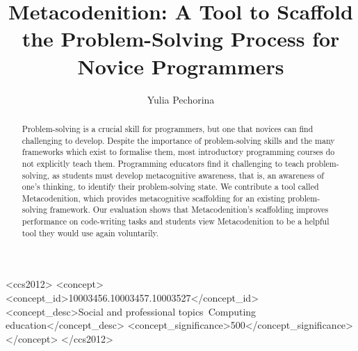 \documentclass[sigconf,authorversion,nonacm]{acmart}
\begin{document}
\title{Metacodenition: A Tool to Scaffold the Problem-Solving Process for Novice Programmers}

\author{Yulia Pechorina}
\renewcommand{\shortauthors}{Yulia Pechorina}

\begin{abstract}
Problem-solving is a crucial skill for programmers, but one that novices can find challenging to develop. Despite the importance of problem-solving skills and the many frameworks which exist to formalise them, most introductory programming courses do not explicitly teach them. Programming educators find it challenging to teach problem-solving, as students must develop metacognitive awareness, that is, an awareness of one's thinking, to identify their problem-solving state. We contribute a tool called Metacodenition, which provides metacognitive scaffolding for an existing problem-solving framework. Our evaluation shows that Metacodenition's scaffolding improves performance on code-writing tasks and students view Metacodenition to be a helpful tool they would use again voluntarily.
\end{abstract}

\begin{CCSXML}
<ccs2012>
   <concept>
       <concept_id>10003456.10003457.10003527</concept_id>
       <concept_desc>Social and professional topics~Computing education</concept_desc>
       <concept_significance>500</concept_significance>
   </concept>
 </ccs2012>
\end{CCSXML}
\end{document}
